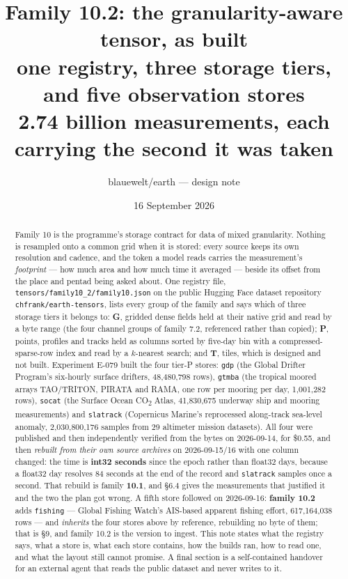 \documentclass[10pt]{article}
\title{Family 10.2: the granularity-aware tensor, as built\\
one registry, three storage tiers, and five observation stores\\
\large 2.74 billion measurements, each carrying the second it was taken}
\author{blauewelt/earth --- design note}
\date{16 September 2026}
\newcommand{\code}[1]{\texttt{#1}}
\begin{document}
\maketitle

\begin{abstract}
Family 10 is the programme's storage contract for data of mixed granularity.
Nothing is resampled onto a common grid when it is stored: every source keeps
its own resolution and cadence, and the token a model reads carries the
measurement's \emph{footprint} --- how much area and how much time it averaged
--- beside its offset from the place and pentad being asked about. One registry
file, \code{tensors/family10\_2/family10.json} on the public Hugging Face dataset
repository \code{chfrank/earth-tensors}, lists every group of the family and
says which of three storage tiers it belongs to: \textbf{G}, gridded dense
fields held at their native grid and read by a byte range (the four channel
groups of family 7.2, referenced rather than copied); \textbf{P}, points,
profiles and tracks held as columns sorted by five-day bin with a
compressed-sparse-row index and read by a $k$-nearest search; and \textbf{T},
tiles, which is designed and not built. Experiment E-079 built the four tier-P
stores: \code{gdp} (the Global Drifter Program's six-hourly surface drifters,
48,480,798 rows), \code{gtmba} (the tropical moored arrays TAO/TRITON, PIRATA
and RAMA, one row per mooring per day, 1,001,282 rows), \code{socat} (the
Surface Ocean CO\textsubscript{2} Atlas, 41,830,675 underway ship and mooring
measurements) and \code{slatrack} (Copernicus Marine's reprocessed along-track
sea-level anomaly, 2,030,800,176 samples from 29 altimeter mission datasets).
All four were published and then independently verified from the bytes on
2026-09-14, for \$0.55, and then \emph{rebuilt from their own source archives}
on 2026-09-15/16 with one column changed: the time is \textbf{int32 seconds}
since the epoch rather than float32 days, because a float32 day resolves 84
seconds at the end of the record and \code{slatrack} samples once a second.
That rebuild is family \textbf{10.1}, and
\S6.4 gives the measurements that justified it and the two the plan got wrong.
A fifth store followed on 2026-09-16: \textbf{family 10.2} adds \code{fishing}
--- Global Fishing Watch's AIS-based apparent fishing effort, 617,164,038 rows
--- and \emph{inherits} the four stores above by reference, rebuilding no byte
of them; that is \S9, and family 10.2 is the version to ingest. This note states what the
registry says, what a store is, what each store contains, how the builds ran,
how to read one, and what the layout still cannot promise. A final section is a
self-contained handover for an external agent that reads the public dataset and
never writes to it.
\end{abstract}
\end{document}
